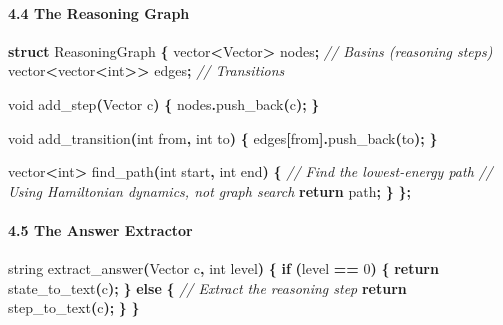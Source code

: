 \documentclass[
  11pt,
  a4paper,
]{article}
\newenvironment{Shaded}{\begin{snugshade}}{\end{snugshade}}
\newcommand{\CommentTok}[1]{\textcolor[rgb]{0.56,0.35,0.01}{\textit{#1}}}
\newcommand{\ControlFlowTok}[1]{\textcolor[rgb]{0.13,0.29,0.53}{\textbf{#1}}}
\newcommand{\DataTypeTok}[1]{\textcolor[rgb]{0.13,0.29,0.53}{#1}}
\newcommand{\DecValTok}[1]{\textcolor[rgb]{0.00,0.00,0.81}{#1}}
\newcommand{\KeywordTok}[1]{\textcolor[rgb]{0.13,0.29,0.53}{\textbf{#1}}}
\newcommand{\NormalTok}[1]{#1}
\newcommand{\OperatorTok}[1]{\textcolor[rgb]{0.81,0.36,0.00}{\textbf{#1}}}
\begin{document}
\paragraph{4.4 The Reasoning Graph}\label{the-reasoning-graph-1}

\begin{Shaded}
\begin{Highlighting}[]
\KeywordTok{struct}\NormalTok{ ReasoningGraph }\OperatorTok{\{}
\NormalTok{    vector}\OperatorTok{\textless{}}\NormalTok{Vector}\OperatorTok{\textgreater{}}\NormalTok{ nodes}\OperatorTok{;}  \CommentTok{// Basins (reasoning steps)}
\NormalTok{    vector}\OperatorTok{\textless{}}\NormalTok{vector}\OperatorTok{\textless{}}\DataTypeTok{int}\OperatorTok{\textgreater{}\textgreater{}}\NormalTok{ edges}\OperatorTok{;}  \CommentTok{// Transitions}
    
    \DataTypeTok{void}\NormalTok{ add\_step}\OperatorTok{(}\NormalTok{Vector c}\OperatorTok{)} \OperatorTok{\{}
\NormalTok{        nodes}\OperatorTok{.}\NormalTok{push\_back}\OperatorTok{(}\NormalTok{c}\OperatorTok{);}
    \OperatorTok{\}}
    
    \DataTypeTok{void}\NormalTok{ add\_transition}\OperatorTok{(}\DataTypeTok{int}\NormalTok{ from}\OperatorTok{,} \DataTypeTok{int}\NormalTok{ to}\OperatorTok{)} \OperatorTok{\{}
\NormalTok{        edges}\OperatorTok{[}\NormalTok{from}\OperatorTok{].}\NormalTok{push\_back}\OperatorTok{(}\NormalTok{to}\OperatorTok{);}
    \OperatorTok{\}}
    
\NormalTok{    vector}\OperatorTok{\textless{}}\DataTypeTok{int}\OperatorTok{\textgreater{}}\NormalTok{ find\_path}\OperatorTok{(}\DataTypeTok{int}\NormalTok{ start}\OperatorTok{,} \DataTypeTok{int}\NormalTok{ end}\OperatorTok{)} \OperatorTok{\{}
        \CommentTok{// Find the lowest{-}energy path}
        \CommentTok{// Using Hamiltonian dynamics, not graph search}
        \ControlFlowTok{return}\NormalTok{ path}\OperatorTok{;}
    \OperatorTok{\}}
\OperatorTok{\};}
\end{Highlighting}
\end{Shaded}

\paragraph{4.5 The Answer Extractor}\label{the-answer-extractor}

\begin{Shaded}
\begin{Highlighting}[]
\NormalTok{string extract\_answer}\OperatorTok{(}\NormalTok{Vector c}\OperatorTok{,} \DataTypeTok{int}\NormalTok{ level}\OperatorTok{)} \OperatorTok{\{}
    \ControlFlowTok{if} \OperatorTok{(}\NormalTok{level }\OperatorTok{==} \DecValTok{0}\OperatorTok{)} \OperatorTok{\{}
        \ControlFlowTok{return}\NormalTok{ state\_to\_text}\OperatorTok{(}\NormalTok{c}\OperatorTok{);}
    \OperatorTok{\}} \ControlFlowTok{else} \OperatorTok{\{}
        \CommentTok{// Extract the reasoning step}
        \ControlFlowTok{return}\NormalTok{ step\_to\_text}\OperatorTok{(}\NormalTok{c}\OperatorTok{);}
    \OperatorTok{\}}
\OperatorTok{\}}
\end{Highlighting}
\end{Shaded}
\end{document}
